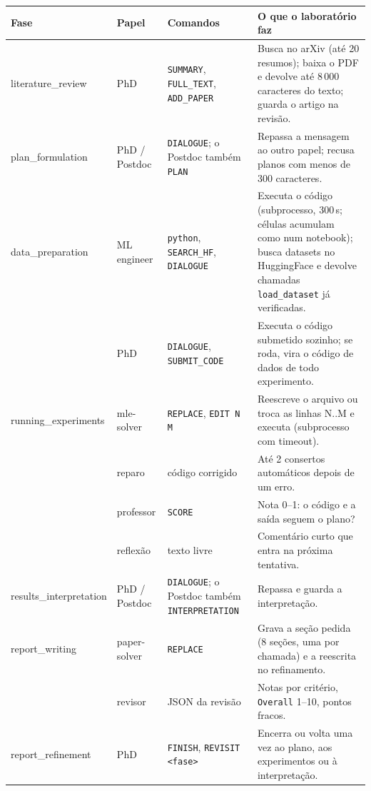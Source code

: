 \documentclass[11pt,a4paper]{article}
\newcommand{\fase}[1]{\textsf{#1}}
\begin{document}
\begin{center}
\small
\begin{tabularx}{\textwidth}{>{\raggedright\arraybackslash}p{2.6cm} >{\raggedright\arraybackslash}p{2.3cm} >{\raggedright\arraybackslash}p{3.3cm} X}
\toprule
Fase & Papel & Comandos & O que o laboratório faz \\
\midrule
\fase{literature\_review} & PhD &
  \texttt{SUMMARY}, \texttt{FULL\_TEXT}, \texttt{ADD\_PAPER} &
  Busca no arXiv (até 20 resumos); baixa o PDF e devolve até 8\,000 caracteres do texto;
  guarda o artigo na revisão. \\
\fase{plan\_formulation} & PhD / Postdoc &
  \texttt{DIALOGUE}; o Postdoc também \texttt{PLAN} &
  Repassa a mensagem ao outro papel; recusa planos com menos de 300 caracteres. \\
\fase{data\_preparation} & ML engineer &
  \texttt{python}, \texttt{SEARCH\_HF}, \texttt{DIALOGUE} &
  Executa o código (subprocesso, 300\,s; células acumulam como num notebook); busca datasets no
  HuggingFace e devolve chamadas \texttt{load\_dataset} já verificadas. \\
 & PhD & \texttt{DIALOGUE}, \texttt{SUBMIT\_CODE} &
  Executa o código submetido sozinho; se roda, vira o código de dados de todo experimento. \\
\fase{running\_experiments} & mle-solver &
  \texttt{REPLACE}, \texttt{EDIT N M} &
  Reescreve o arquivo ou troca as linhas N..M e executa (subprocesso com timeout). \\
 & reparo & código corrigido & Até 2 consertos automáticos depois de um erro. \\
 & professor & \texttt{SCORE} & Nota 0--1: o código e a saída seguem o plano? \\
 & reflexão & texto livre & Comentário curto que entra na próxima tentativa. \\
\fase{results\_interpretation} & PhD / Postdoc &
  \texttt{DIALOGUE}; o Postdoc também \texttt{INTERPRETATION} & Repassa e guarda a interpretação. \\
\fase{report\_writing} & paper-solver & \texttt{REPLACE} &
  Grava a seção pedida (8 seções, uma por chamada) e a reescrita no refinamento. \\
 & revisor & JSON da revisão & Notas por critério, \texttt{Overall} 1--10, pontos fracos. \\
\fase{report\_refinement} & PhD & \texttt{FINISH}, \texttt{REVISIT <fase>} &
  Encerra ou volta uma vez ao plano, aos experimentos ou à interpretação. \\
\bottomrule
\end{tabularx}
\end{center}
\end{document}
